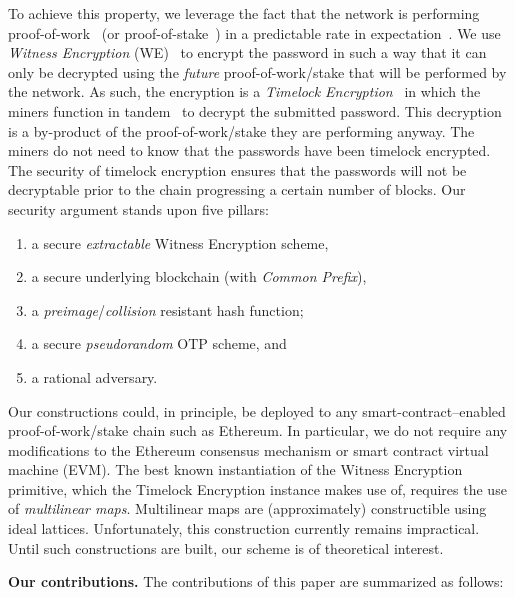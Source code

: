 To achieve this property, we leverage the fact that the network is performing
proof-of-work~\cite{pow} (or proof-of-stake~\cite{ouroboros}) in a predictable rate in expectation~\cite{bitcoin-sok}. We use \emph{Witness Encryption}
(WE)~\cite{STOC:GGSW13} to encrypt
the password in such a way that it can only be decrypted using the \emph{future}
proof-of-work/stake that will be performed by the network. As such, the encryption
is a \emph{Timelock Encryption}~\cite{timelock} in which the miners function in tandem~\cite{timelock-bitcoin} to
decrypt the submitted password. This decryption is a by-product of
the proof-of-work/stake they are performing anyway. The miners do not need to know that the
passwords have been timelock encrypted. The security of timelock encryption
ensures that the passwords will not be decryptable prior to the chain progressing
a certain number of blocks. Our security argument stands upon five pillars:

\begin{enumerate}
      \item a secure \emph{extractable} Witness Encryption scheme,
      \item a secure underlying blockchain (with \emph{Common Prefix}),
      \item a \emph{preimage}/\emph{collision} resistant hash function;
      \item a secure \emph{pseudorandom} OTP scheme, and
      \item a rational adversary.
\end{enumerate}

Our constructions could, in principle, be deployed to any smart-contract--enabled
proof-of-work/stake chain such as Ethereum. In particular, we do not require any modifications
to the Ethereum consensus mechanism or smart contract virtual machine (EVM). The
best known instantiation of the Witness Encryption primitive, which the Timelock Encryption
instance makes use of, requires the use of \emph{multilinear maps}.
Multilinear maps are (approximately) constructible using ideal lattices.
Unfortunately, this construction currently remains impractical.
Until such constructions are built, our scheme is of theoretical interest.

\noindent
\textbf{Our contributions.}
The contributions of this paper are summarized as follows:

